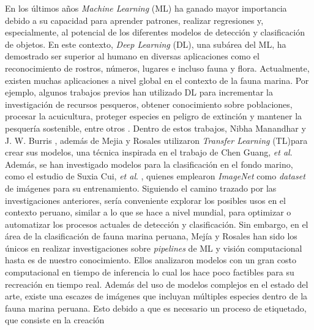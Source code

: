 
En los últimos años \textit{Machine Learning} (ML) ha ganado  
mayor importancia debido a su capacidad para aprender patrones, 
realizar regresiones y, especialmente, al potencial de los diferentes 
modelos de detección y clasificación de objetos. En este contexto, \textit{Deep Learning} (DL), 
una subárea del ML, ha demostrado ser superior al humano en diversas 
aplicaciones como el reconocimiento de rostros, números, lugares e incluso fauna y flora.
\newline
\newline
Actualmente, existen muchas aplicaciones a nivel global en el contexto de la fauna marina. 
Por ejemplo, algunos trabajos previos han utilizado DL para incrementar la investigación de 
recursos pesqueros, obtener conocimiento sobre poblaciones, procesar la acuicultura, proteger 
especies en peligro de extinción y mantener la pesquería sostenible, entre otros
\cite{10.1145/3419635.3419643, 10.1145/3325917.3325934,20.500.12724/11174,8371919}.
\newline
\newline
Dentro de estos trabajos, Nibha Manandhar y J. W. Burris , además de 
Mejia y Rosales utilizaron \textit{Transfer Learning} (TL)para crear sus modelos, 
una técnica inspirada en el trabajo de Chen Guang, 
\textit{et al}. Además, se han investigado modelos para la 
clasificación en el fondo marino, como el estudio de Suxia Cui, 
\textit{et al}. \cite{Cui2020}, quienes emplearon \textit{ImageNet} \cite{ImageNet} como 
\textit{dataset} de imágenes para su entrenamiento. 
\newline
\newline
Siguiendo el camino trazado por las investigaciones anteriores, sería conveniente explorar 
los posibles usos en el contexto peruano, similar a lo que se hace a nivel 
mundial, para optimizar o automatizar los procesos actuales de detección y 
clasificación. Sin embargo, en el área de la clasificación de fauna marina 
peruana, Mejía y Rosales han sido los únicos en 
realizar investigaciones sobre \textit{pipelines} de ML y visión 
computacional hasta es de nuestro conocimiento. Ellos analizaron modelos con 
un gran costo computacional en tiempo de inferencia lo cual los hace poco 
factibles para su recreación en tiempo real. 
\newline
\newline
Además del uso de modelos complejos en el estado del arte, existe una escazes 
de imágenes que incluyan múltiples especies dentro de la fauna marina peruana. 
Esto debido a que es necesario un proceso de etiquetado, que consiste en la creación 

